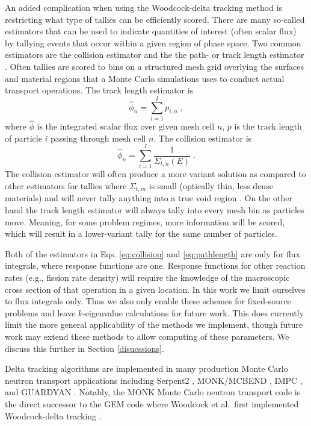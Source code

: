 An added complication when using the Woodcock-delta tracking method is restricting what type of tallies can be efficiently scored.
There are many so-called estimators that can be used to indicate quantities of interest (often scalar flux) by tallying events that occur within a given region of phase space.
Two common estimators are the collision estimator and the the path- or track length estimator \cite{lewis_computational_1984}.
Often tallies are scored to bins on a structured mesh grid overlying the surfaces and material regions that a Monte Carlo simulations uses to conduct actual transport operations.
The track length estimator is
\begin{equation}
    \label{eq:pathlength}
    \hat{\phi}_n = \sum_{i=1}^{I}p_{i,n} \; ,
\end{equation}
where $\hat{\phi}$ is the integrated scalar flux over given mesh cell $n$, $p$ is the track length of particle $i$ passing through mesh cell $n$.
The collision estimator is
\begin{equation}
    \label{eq:collision}
    \hat{\phi}_n = \sum_{i=1}^{I} \frac{1}{\Sigma_{t,n}(E)} \;.
\end{equation}
The collision estimator will often produce a more variant solution as compared to other estimators for tallies where $\Sigma_{t,m}$ is small (optically thin, less dense materials) and will never tally anything into a true void region \cite{mc2018, leppanen_use_2017}.
On the other hand the track length estimator will always tally into every mesh bin as particles move.
Meaning, for some problem regimes, more information will be scored, which will result in a lower-variant tally for the same number of particles.

Both of the estimators in Eqs. \eqref{eq:collision} and \eqref{eq:pathlength} are only for flux integrals, where response functions are one.
Response functions for other reaction rates (e.g., fission rate density) will require the knowledge of the macroscopic cross section of that operation in a given location.
In this work we limit ourselves to flux integrals only.
Thus we also only enable these schemes for fixed-source problems and leave $k$-eigenvalue calculations for future work.
This does currently limit the more general applicability of the methods we implement, though future work may extend these methods to allow computing of these parameters.
We discuss this further in Section \ref{disucssions}.

Delta tracking algorithms are implemented in many production Monte Carlo neutron transport applications including Serpent2 \cite{leppanen_2010_burnup, leppanen_use_2017, leppanen_development_2013}, MONK/MCBEND \cite{richards_monk_2015}, IMPC \cite{fang_development_2022}, and GUARDYAN \cite{molnar_gpu_based_2019}.
Notably, the MONK Monte Carlo neutron transport code is the direct successor to the GEM code where Woodcock et al.~first implemented Woodcock-delta tracking \cite{woodcock_techniques_1965}.

